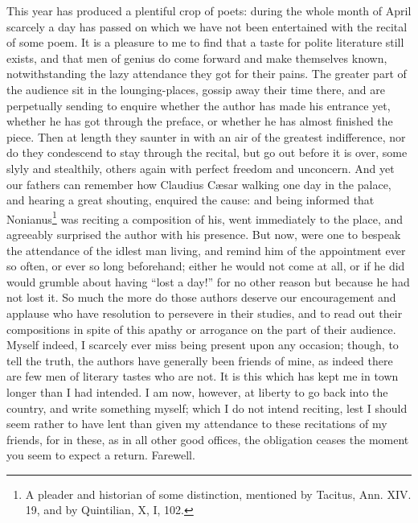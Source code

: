 This year has produced a plentiful crop of poets: during the whole month
of April scarcely a day has passed on which we have not been entertained
with the recital of some poem. It is a pleasure to me to find that a taste
for polite literature still exists, and that men of genius do come forward
and make themselves known, notwithstanding the lazy attendance they got
for their pains. The greater part of the audience sit in the
lounging-places, gossip away their time there, and are perpetually sending
to enquire whether the author has made his entrance yet, whether he has
got through the preface, or whether he has almost finished the piece. Then
at length they saunter in with an air of the greatest indifference, nor do
they condescend to stay through the recital, but go out before it is over,
some slyly and stealthily, others again with perfect freedom and
unconcern. And yet our fathers can remember how Claudius Cæsar walking one
day in the palace, and hearing a great shouting, enquired the cause: and
being informed that Nonianus\footnote{A pleader and historian
of some distinction, mentioned by Tacitus, Ann. XIV. 19, and by
Quintilian, X, I, 102.} was reciting a composition of his, went
immediately to the place, and agreeably surprised the author with his
presence. But now, were one to bespeak the attendance of the idlest man
living, and remind him of the appointment ever so often, or ever so long
beforehand; either he would not come at all, or if he did would grumble
about having ``lost a day!'' for no other reason but because he had not lost
it. So much the more do those authors deserve our encouragement and
applause who have resolution to persevere in their studies, and to read
out their compositions in spite of this apathy or arrogance on the part of
their audience. Myself indeed, I scarcely ever miss being present upon any
occasion; though, to tell the truth, the authors have generally been
friends of mine, as indeed there are few men of literary tastes who are
not. It is this which has kept me in town longer than I had intended. I am
now, however, at liberty to go back into the country, and write something
myself; which I do not intend reciting, lest I should seem rather to have
lent than given my attendance to these recitations of my friends, for in
these, as in all other good offices, the obligation ceases the moment you
seem to expect a return. Farewell.



